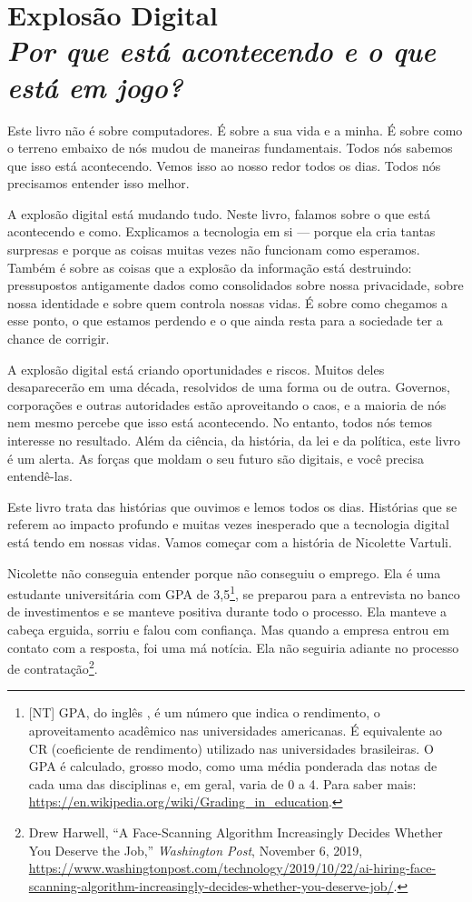 \chapter[Explosão Digital]{Explosão Digital\\\large\textit{Por que está
acontecendo e o que está em jogo?}}
\label{cap1:exp-dig}

Este livro não é sobre computadores. É sobre a sua vida e a minha. É sobre como
o terreno embaixo de nós mudou de maneiras fundamentais. Todos nós sabemos que
isso está acontecendo. Vemos isso ao nosso redor todos os dias. Todos nós
precisamos entender isso melhor.

A explosão digital está mudando tudo. Neste livro, falamos sobre o que está
acontecendo e como. Explicamos a tecnologia em si --- porque ela cria tantas 
surpresas e porque as coisas muitas vezes não funcionam como esperamos. Também 
é sobre as coisas que a explosão da informação está destruindo: pressupostos
antigamente dados como consolidados sobre nossa privacidade, sobre nossa
identidade e sobre quem controla nossas vidas. É sobre como chegamos a esse
ponto, o que estamos perdendo e o que ainda resta para a sociedade ter a chance
de corrigir.

A explosão digital está criando oportunidades e riscos. Muitos deles 
desaparecerão em uma década, resolvidos de uma forma ou de outra. Governos, 
corporações e outras autoridades estão aproveitando o caos, e a maioria de nós 
nem mesmo percebe que isso está acontecendo. No entanto, todos nós temos
interesse no resultado. Além da ciência, da história, da lei e da política, este
livro é um alerta. As forças que moldam o seu futuro são digitais, e você 
precisa entendê-las.

Este livro trata das histórias que ouvimos e lemos todos os dias. Histórias que 
se referem ao impacto profundo e muitas vezes inesperado que a tecnologia 
digital está tendo em nossas vidas. Vamos começar com a história de Nicolette 
Vartuli.

Nicolette não conseguia entender porque não conseguiu o emprego. Ela é uma
estudante universitária com GPA de 3,5\footnote{[NT] GPA, do inglês
, é um número que indica o rendimento, o
aproveitamento acadêmico nas universidades americanas. É equivalente ao CR
(coeficiente de rendimento) utilizado nas universidades brasileiras. O GPA é
calculado, grosso modo, como uma média ponderada das notas de cada uma das
disciplinas e, em geral, varia de 0 a 4. Para saber mais:
\url{https://en.wikipedia.org/wiki/Grading_in_education}.}, 
se preparou para a entrevista no banco de investimentos e se manteve
positiva durante todo o processo. Ela manteve a cabeça erguida, sorriu e falou
com confiança. Mas quando a empresa entrou em contato com a resposta, foi uma má
notícia. Ela não seguiria adiante no processo de contratação\footnote{Drew
Harwell, ``A Face-Scanning Algorithm Increasingly Decides Whether You Deserve
the Job,'' \textit{Washington Post}, November 6, 2019, \url{https://www.washingtonpost.com/technology/2019/10/22/ai-hiring-face-scanning-algorithm-increasingly-decides-whether-you-deserve-job/}.}. 

